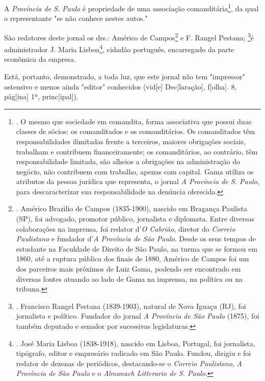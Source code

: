 A \emph{Província de S. Paulo} é propriedade de uma associação
comanditária\footnote{. O mesmo que sociedade em comandita, forma
  associativa que possui duas classes de sócios: os comanditados e os
  comanditários. Os comanditados têm responsabilidades ilimitadas frente
  a terceiros, maiores obrigações sociais, trabalham e contribuem
  financeiramente; os comanditários, ao contrário, têm responsabilidade
  limitada, são alheios a obrigações na administração do negócio, não
  contribuem com trabalho, apenas com capital. Gama utiliza os atributos
  da pessoa jurídica que representa, o jornal \emph{A Província de S.
  Paulo}, para descaracterizar sua responsabilidade na denúncia
  oferecida.}, da qual o representante "se não conhece nestes autos."

São redatores deste jornal os drs.: Américo de Campos\footnote{. Américo
  Brazilio de Campos (1835-1900), nascido em Bragança Paulista (SP), foi
  advogado, promotor público, jornalista e diplomata. Entre diversas
  colaborações na imprensa, foi redator d'\emph{O Cabrião}, diretor do
  \emph{Correio Paulistano} e fundador d'\emph{A Província de São
  Paulo}. Desde os seus tempos de estudante na Faculdade de Direito de
  São Paulo, na turma que se formou em 1860, até a ruptura pública dos
  finais de 1880, Américo de Campos foi um dos parceiros mais próximos
  de Luiz Gama, podendo ser encontrado em diversas fontes atuando ao
  lado de Gama na imprensa, na política ou na tribuna.} e F. Rangel
Pestana; \footnote{. Francisco Rangel Pestana (1839-1903), natural de
  Nova Iguaçu (RJ), foi jornalista e político. Fundador do jornal
  \emph{A Província de São Paulo} (1875), foi também deputado e senador
  por sucessivas legislaturas.}é administrador J. Maria Lisboa\footnote{.
  José Maria Lisboa (1838-1918), nascido em Lisboa, Portugal, foi
  jornalista, tipógrafo, editor e empresário radicado em São Paulo.
  Fundou, dirigiu e foi redator de dezenas de periódicos, destacando-se
  o \emph{Correio Paulistano}, \emph{A Província de São Paulo} e o
  \emph{Almanach Litterario de S. Paulo}.}, cidadão português,
encarregado da parte econômica da empresa.

Está, portanto, demonstrado, a toda luz, que este jornal não tem
"impressor" ostensivo e menos ainda "editor" conhecidos (vid{[}e{]}
Dec{[}laração{]}, f{[}olha{]}. 8, pág{[}ina{]} 1ª, princ{[}ipal{]}).

